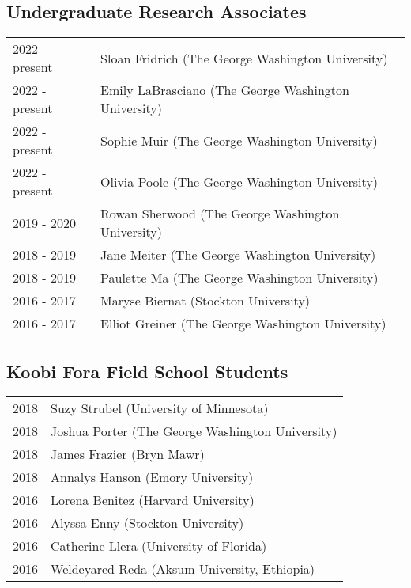 \documentclass{article}
\begin{document}
\subsection*{Undergraduate Research Associates}
\begin{tabular}{p{}p{}}
2022 - present &  Sloan Fridrich (The George Washington University)\\[4pt]
2022 - present &  Emily LaBrasciano (The George Washington University)\\[4pt]
2022 - present &  Sophie Muir (The George Washington University)\\[4pt]
2022 - present & Olivia Poole (The George Washington University)\\[4pt]
2019 - 2020 & Rowan Sherwood (The George Washington University)\\[4pt]
2018 - 2019 & Jane Meiter (The George Washington University)\\[4pt]
2018 - 2019 & Paulette Ma (The George Washington University)\\[4pt]
2016 - 2017 & Maryse Biernat (Stockton University)\\[4pt]
2016 - 2017 & Elliot Greiner (The George Washington University)\\
\end{tabular} 

\subsection*{Koobi Fora Field School Students}
\begin{tabular}{p{}p{}}
2018 & Suzy Strubel (University of Minnesota)\\[4pt]
2018 & Joshua Porter (The George Washington University)\\[4pt]
2018 & James Frazier (Bryn Mawr)\\[4pt] 
2018 & Annalys Hanson (Emory University)\\[4pt]
2016 & Lorena Benitez (Harvard University)\\[4pt]
2016 & Alyssa Enny (Stockton University)\\[4pt]
2016 & Catherine Llera (University of Florida)\\[4pt]
2016 & Weldeyared Reda (Aksum University, Ethiopia)\\
\end{tabular}
 
\end{document}

